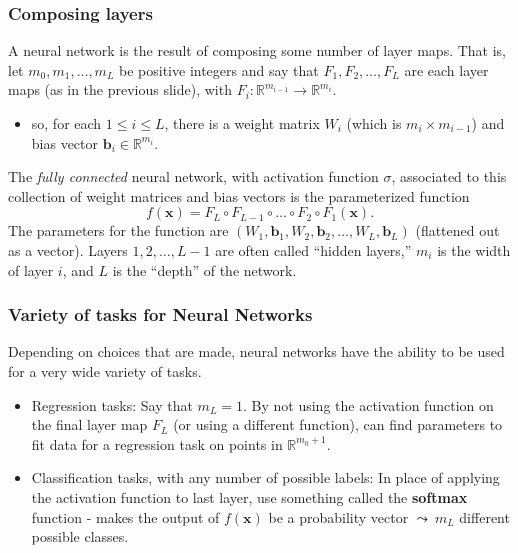 \documentclass[smaller]{beamer}
\theoremstyle{example}
\newcommand{\x}{\textbf{x}}
\begin{document}
\begin{frame}
    \frametitle{Composing layers}
    A neural network is the result of composing some number of layer maps. That is, let $m_0, m_1,\ldots, m_L$ be positive integers and say that $F_1, F_2,\ldots, F_L$ are each layer maps (as in the previous slide), with $F_i:\mathbb R^{m_{i-1}}\to \mathbb R^{m_i}$.
    \begin{itemize}
        \item so, for each $1\le i\le L$, there is a weight matrix $W_i$ (which is $m_i\times m_{i-1}$) and bias vector $\textbf{b}_i \in \mathbb R^{m_i}$.
    \end{itemize}
    \pause

    The \textit{fully connected} neural network, with activation function $\sigma$, associated to this collection of weight matrices and bias vectors is the parameterized function 
        \[f(\x) = F_L\circ F_{L-1}\circ \ldots \circ F_2\circ F_1(\x).\]
    The parameters for the function are $(W_1,\textbf{b}_1, W_2, \textbf{b}_2, \ldots, W_L, \textbf{b}_L)$ (flattened out as a vector). Layers $1,2,\ldots, L-1$ are often called ``hidden layers,'' $m_i$ is the width of layer $i$, and $L$ is the ``depth'' of the network.
\end{frame}

\begin{frame}
    \frametitle{Variety of tasks for Neural Networks}
    Depending on choices that are made, neural networks have the ability to be used for a very wide variety of tasks. 

    \begin{itemize}
        \item Regression tasks: Say that $m_L = 1$. By not using the activation function on the final layer map $F_L$ (or using a different function), can find parameters to fit data for a regression task on points in $\mathbb R^{m_0+1}$.
        \item Classification tasks, with any number of possible labels: In place of applying the activation function to last layer, use something called the \textbf{softmax} function - makes the output of $f(\x)$ be a probability vector $\leadsto\ m_L$ different possible classes. 
    \end{itemize}
\end{frame}
\end{document}
